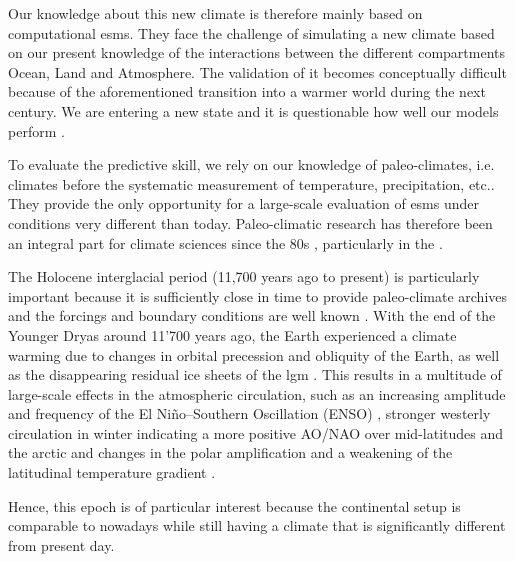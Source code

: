 \begin{refsection}
Our knowledge about this new climate is therefore mainly based on computational \glspl{esm}. They face the challenge of simulating a new climate based on our present knowledge of the interactions between the different compartments Ocean, Land and Atmosphere. The validation of it becomes conceptually difficult because of the aforementioned transition into a warmer world during the next century. We are entering a new state and it is questionable how well our models perform \citep{HargreavesAnnanOhgaitoEtAl2013, MauriDavisCollinsEtAl2014}.

To evaluate the predictive skill, we rely on our knowledge of paleo-climates, i.e. climates before the systematic measurement of temperature, precipitation, etc.. They provide the only opportunity for a large-scale evaluation of \glspl{esm} under conditions very different than today. Paleo-climatic research has therefore been an integral part for climate sciences since the 80s \citep{COHMAPMembers1988, JoussaumeTaylor1995}, particularly in the  \citep{BraconnotOttoBliesnerHarrisonEtAl2007, BraconnotOttoBliesnerHarrisonEtAl2007a, BraconnotHarrisonKageyamaEtAl2012, KageyamaBraconnotHarrisonEtAl2016, Otto-BliesnerBraconnotHarrisonEtAl2017, JungclausBardBaroniEtAl2017}.

The Holocene interglacial period (11,700 years ago to present)  \citep{WalkerJohnsenRasmussenEtAl2009} is particularly important because it is sufficiently close in time to provide paleo-climate archives and the forcings and boundary conditions are well known \citep{WannerBeerButikoferEtAl2008}. With the end of the Younger Dryas around 11'700 years ago, the Earth experienced a climate warming due to changes in orbital precession and obliquity of the Earth, as well as the disappearing residual ice sheets of the \gls{lgm} \citep{BergerLoutre1991, Peltier2004}. This results in a multitude of large-scale effects in the atmospheric circulation, such as an increasing amplitude and frequency of the El Niño–Southern Oscillation (ENSO) \citep{DondersWagnerCremerVisscher2008}, stronger westerly circulation in winter indicating a more positive AO/NAO over mid-latitudes and the arctic \citep{MauriDavisCollinsEtAl2014, FunderGoosseJepsenEtAl2011} and changes in the polar amplification and a weakening of the latitudinal temperature gradient \citep{DavisBrewer2009}.

Hence, this epoch is of particular interest because the continental setup is comparable to nowadays while still having a climate that is significantly different from present day.


\end{refsection}
